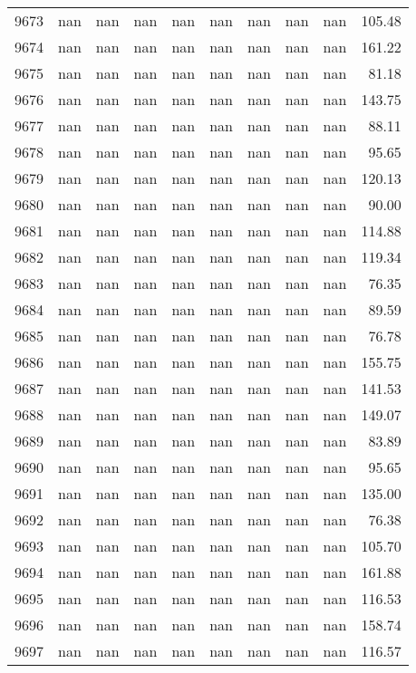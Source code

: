 \begin{tabular}{lrrrrrrrrr}
9673 & nan & nan & nan & nan & nan & nan & nan & nan & 105.48 \\
9674 & nan & nan & nan & nan & nan & nan & nan & nan & 161.22 \\
9675 & nan & nan & nan & nan & nan & nan & nan & nan & 81.18 \\
9676 & nan & nan & nan & nan & nan & nan & nan & nan & 143.75 \\
9677 & nan & nan & nan & nan & nan & nan & nan & nan & 88.11 \\
9678 & nan & nan & nan & nan & nan & nan & nan & nan & 95.65 \\
9679 & nan & nan & nan & nan & nan & nan & nan & nan & 120.13 \\
9680 & nan & nan & nan & nan & nan & nan & nan & nan & 90.00 \\
9681 & nan & nan & nan & nan & nan & nan & nan & nan & 114.88 \\
9682 & nan & nan & nan & nan & nan & nan & nan & nan & 119.34 \\
9683 & nan & nan & nan & nan & nan & nan & nan & nan & 76.35 \\
9684 & nan & nan & nan & nan & nan & nan & nan & nan & 89.59 \\
9685 & nan & nan & nan & nan & nan & nan & nan & nan & 76.78 \\
9686 & nan & nan & nan & nan & nan & nan & nan & nan & 155.75 \\
9687 & nan & nan & nan & nan & nan & nan & nan & nan & 141.53 \\
9688 & nan & nan & nan & nan & nan & nan & nan & nan & 149.07 \\
9689 & nan & nan & nan & nan & nan & nan & nan & nan & 83.89 \\
9690 & nan & nan & nan & nan & nan & nan & nan & nan & 95.65 \\
9691 & nan & nan & nan & nan & nan & nan & nan & nan & 135.00 \\
9692 & nan & nan & nan & nan & nan & nan & nan & nan & 76.38 \\
9693 & nan & nan & nan & nan & nan & nan & nan & nan & 105.70 \\
9694 & nan & nan & nan & nan & nan & nan & nan & nan & 161.88 \\
9695 & nan & nan & nan & nan & nan & nan & nan & nan & 116.53 \\
9696 & nan & nan & nan & nan & nan & nan & nan & nan & 158.74 \\
9697 & nan & nan & nan & nan & nan & nan & nan & nan & 116.57 \\

\end{tabular}
